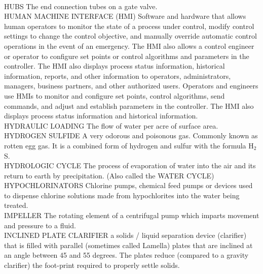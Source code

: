 \vspace{0.3cm}\\
HUBS
The end connection tubes on a gate valve.
\vspace{0.3cm}\\
HUMAN MACHINE INTERFACE (HMI)
Software and hardware that allows human operators to monitor the state of a process under control, modify control settings to change the control objective, and manually override automatic control operations in the event of an emergency. The HMI also allows a control engineer or operator to configure set points or control algorithms and parameters in the controller. The HMI also displays process status information, historical information, reports, and other information to operators, administrators, managers, business partners, and other authorized users. Operators and engineers use HMIs to monitor and configure set points, control algorithms, send commands, and adjust and establish parameters in the controller. The HMI also displays process status information and historical information.
\vspace{0.3cm}\\
HYDRAULIC LOADING
The flow of water per acre of surface area.
\vspace{0.3cm}\\
HYDROGEN SULFIDE
A very odorous and poisonous gas. Commonly known as rotten egg gas. It is a combined form of hydrogen and sulfur with the formula H$_2$S.
\vspace{0.3cm}\\
HYDROLOGIC CYCLE
The process of evaporation of water into the air and its return to earth by precipitation. (Also called the WATER CYCLE)
\vspace{0.3cm}\\
HYPOCHLORINATORS
Chlorine pumps, chemical feed pumps or devices used to dispense chlorine solutions made from hypochlorites into the water being treated.
\vspace{0.3cm}\\
IMPELLER
The rotating element of a centrifugal pump which imparts movement and pressure to a fluid.
\vspace{0.3cm}\\
INCLINED PLATE CLARIFIER
a solids / liquid separation device (clarifier) that is filled with parallel (sometimes called Lamella) plates that are inclined at an angle between 45 and 55 degrees. The plates reduce (compared to a gravity clarifier) the foot-print required to properly settle solids.
\vspace{0.3cm}\\
